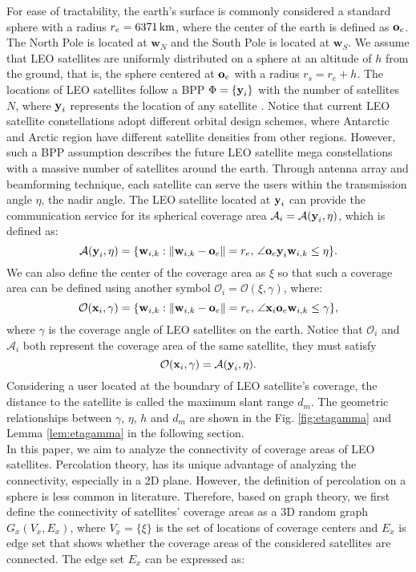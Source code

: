 \documentclass[final]{IEEEtran}
\begin{document}
For ease of tractability, the earth's surface is commonly considered a standard sphere with a radius $r_e=6371\, \rm km$, where the center of the earth is defined as $\textbf{o}_e$. The North Pole is located at $\textbf{w}_N$ and the South Pole is located at $\textbf{w}_S$. We assume that LEO satellites are uniformly distributed on a sphere at an altitude of $h$ from the ground, that is, the sphere centered at $\textbf{o}_e$ with a radius $r_s=r_e+h$. The locations of LEO satellites follow a BPP $\Phi=\{\textbf{y}_i\}$ with the number of satellites $N$, where $\textbf{y}_i$ represents the location of any satellite  \cite{talgat2020stochastic,wang2023coverage,talgat2024stochastic}. Notice that current LEO satellite constellations adopt different orbital design schemes, where Antarctic and Arctic region have different satellite densities from other regions. However, such a BPP assumption describes the future LEO satellite mega constellations with a massive number of satellites around the earth. Through antenna array and beamforming technique, each satellite can serve the users within the transmission angle $\eta$, \ie the nadir angle. The LEO satellite located at $\textbf{y}_i$ can provide the communication service for its spherical coverage area $\mathcal{A}_i=\mathcal{A}(\textbf{y}_i,\eta)$, which is defined as:
\begin{equation}
    \mathcal{A}(\textbf{y}_i,\eta)=\{\textbf{w}_{i,k}:\|\textbf{w}_{i,k}-\textbf{o}_e\|=r_e,\,\angle \textbf{o}_e\textbf{y}_i\textbf{w}_{i,k}\leq\eta\}.
\end{equation}
We can also define the center of the coverage area as $\xi$ so that such a coverage area can be defined using another symbol $\mathcal{O}_i=\mathcal{O}(\xi,\gamma)$, where:
\begin{equation}
    \mathcal{O}(\textbf{x}_i,\gamma)=\{\textbf{w}_{i,k}:\|\textbf{w}_{i,k}-\textbf{o}_e\|=r_e,\,\angle \textbf{x}_i\textbf{o}_e\textbf{w}_{i,k}\leq\gamma\},
\end{equation}
where $\gamma$ is the coverage angle of LEO satellites on the earth. Notice that $\mathcal{O}_i$ and $\mathcal{A}_i$ both represent the coverage area of the same satellite, they must satisfy
\begin{equation}
    \mathcal{O}(\textbf{x}_i,\gamma)=\mathcal{A}(\textbf{y}_i,\eta).
\end{equation}
Considering a user located at the boundary of LEO satellite's coverage, the distance to the satellite is called the maximum slant range $d_m$. The geometric relationships between $\gamma$, $\eta$, $h$ and $d_m$ are shown in the Fig. \ref{fig:etagamma} and Lemma \ref{lem:etagamma} in the following section.\\
\indent In this paper, we aim to analyze the connectivity of coverage areas of LEO satellites. Percolation theory, has its unique advantage of analyzing the connectivity, especially in a 2D plane. However, the definition of percolation on a sphere is less common in literature. Therefore, based on graph theory, we first define the connectivity of satellites' coverage areas as a 3D random graph $G_x(V_x,E_x)$, where $V_x=\{\xi\}$ is the set of locations of coverage centers and $E_x$ is edge set that shows whether the coverage areas of the considered satellites are connected. The edge set $E_x$ can be expressed as:
\end{document}
